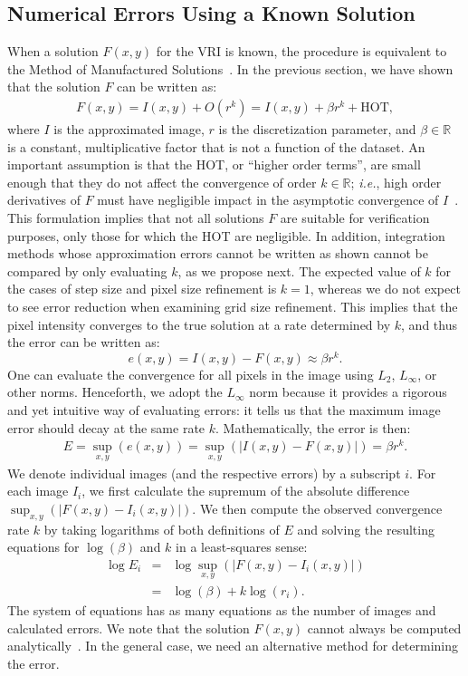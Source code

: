 \subsection{Numerical Errors Using a Known Solution}

When a solution $F(x,y)$ for the VRI is known, the procedure is equivalent
to the Method of Manufactured Solutions~\cite{babuska04}.  In the
previous section, we have shown that the 
solution $F$ can be written as:
\begin{eqnarray}
F(x,y) = I(x,y) + O(r^k) = I(x,y) + \beta r^k + \text{HOT},
\end{eqnarray}
where $I$ is the approximated image, $r$ is the discretization parameter, 
and $\beta \in \mathbb{R}$ is a constant, multiplicative
factor that is not a function of the dataset. An important assumption
is that the HOT, or ``higher order terms'', are small enough that they
do not affect the convergence of order $k \in \mathbb{R}$; {\em i.e.}, high order
derivatives of $F$ must have negligible impact in the asymptotic
convergence of $I$~\cite{Roy2005}. 
This formulation implies that not all solutions
$F$ are suitable for verification purposes, only those for which the HOT are
negligible. In addition, integration methods whose approximation errors 
cannot be written as shown
cannot be compared by only evaluating $k$, as we propose next. 
The expected value of $k$ for the cases of step size and pixel size 
refinement is $k = 1$, whereas we do not expect to see error reduction when 
examining grid size refinement. 
This implies that the pixel intensity
converges to the true solution at a rate determined by $k$, and
thus the error can be written as:
\begin{equation}
e(x,y) = I(x,y) - F(x,y) \approx \beta r^k.
\end{equation}
One can evaluate the convergence for all pixels in the image using
$L_2$, $L_\infty$, or other norms. Henceforth, we adopt the $L_\infty$ norm
because it provides a rigorous and yet intuitive way of evaluating errors: it tells us
that the maximum image error should decay at the same rate
$k$. Mathematically, the error is then:
\begin{eqnarray}
E = \sup_{x,y}(e(x,y)) = \sup_{x,y}(|I(x,y) - F(x,y)|) = \beta r^k.
\end{eqnarray}
We denote individual images (and the respective errors) by a
subscript $i$.  For each image $I_i$, we first calculate the supremum
of the absolute difference $\sup_{x,y}\left( |F(x,y) - I_i(x,y)|
\right)$.  We then compute the observed convergence rate $k$ by
taking logarithms of both definitions of $E$ and solving the resulting
equations for $\log(\beta)$ and $k$ in a least-squares sense:
\begin{eqnarray}
\log E_i &=& \log \sup_{x,y}\left( |F(x,y) - I_i(x,y)|
\right)\nonumber\\
         &=& \log(\beta) + k \log(r_i).
\label{eq:known-solution}
\end{eqnarray}
The system of equations has as many equations as the number of images
and calculated errors.  We note that the solution $F(x,y)$
cannot always be computed analytically~\cite{Max95}. In the general
case, we need an alternative method for determining the error.


